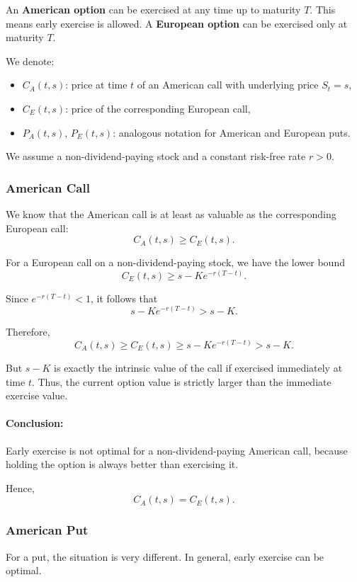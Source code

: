 \documentclass[12pt,a4paper]{article}
\theoremstyle{definition}
\begin{document}
An \textbf{American option} can be exercised at any time up to maturity $T$. This means early exercise is allowed. A \textbf{European option} can be exercised only at maturity $T$.

We denote:
\begin{itemize}
\item $C_A(t, s)$: price at time $t$ of an American call with underlying price $S_t = s$,
\item $C_E(t, s)$: price of the corresponding European call,
\item $P_A(t, s)$, $P_E(t, s)$: analogous notation for American and European puts.
\end{itemize}

We assume a non-dividend-paying stock and a constant risk-free rate $r > 0$.

\subsubsection{American Call}

We know that the American call is at least as valuable as the corresponding European call:
\[
C_A(t, s) \geq C_E(t, s).
\]

For a European call on a non-dividend-paying stock, we have the lower bound
\[
C_E(t, s) \geq s - K e^{-r(T-t)}.
\]

Since $e^{-r(T-t)} < 1$, it follows that
\[
s - K e^{-r(T-t)} > s - K.
\]

Therefore,
\[
C_A(t, s) \geq C_E(t, s) \geq s - K e^{-r(T-t)} > s - K.
\]

But $s - K$ is exactly the intrinsic value of the call if exercised immediately at time $t$. Thus, the current option value is strictly larger than the immediate exercise value.

\paragraph{Conclusion:} Early exercise is not optimal for a non-dividend-paying American call, because holding the option is always better than exercising it.

Hence,
\[
\boxed{C_A(t, s) = C_E(t, s).}
\]

\subsubsection{American Put}

For a put, the situation is very different. In general, early exercise can be optimal.
\end{document}
